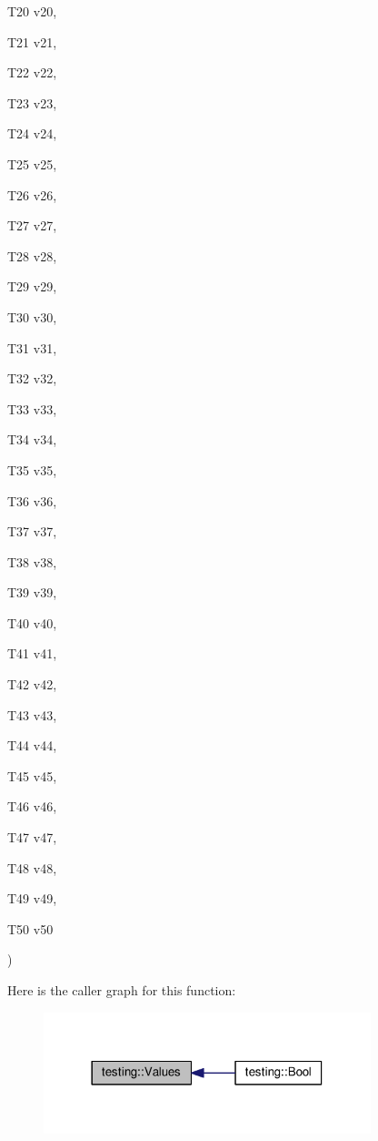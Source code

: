 {{\begin{DoxyParamCaption}
\item[{T20}]{v20, }
\item[{T21}]{v21, }
\item[{T22}]{v22, }
\item[{T23}]{v23, }
\item[{T24}]{v24, }
\item[{T25}]{v25, }
\item[{T26}]{v26, }
\item[{T27}]{v27, }
\item[{T28}]{v28, }
\item[{T29}]{v29, }
\item[{T30}]{v30, }
\item[{T31}]{v31, }
\item[{T32}]{v32, }
\item[{T33}]{v33, }
\item[{T34}]{v34, }
\item[{T35}]{v35, }
\item[{T36}]{v36, }
\item[{T37}]{v37, }
\item[{T38}]{v38, }
\item[{T39}]{v39, }
\item[{T40}]{v40, }
\item[{T41}]{v41, }
\item[{T42}]{v42, }
\item[{T43}]{v43, }
\item[{T44}]{v44, }
\item[{T45}]{v45, }
\item[{T46}]{v46, }
\item[{T47}]{v47, }
\item[{T48}]{v48, }
\item[{T49}]{v49, }
\item[{T50}]{v50}
\end{DoxyParamCaption}
)}}\label{namespacetesting_a7b6008393a1fa7b55b07fbad67c1c811}


Here is the caller graph for this function\-:\nopagebreak
\begin{figure}[H]
\begin{center}
\leavevmode
\includegraphics[width=270pt]{namespacetesting_a7b6008393a1fa7b55b07fbad67c1c811_icgraph}
\end{center}
\end{figure}


